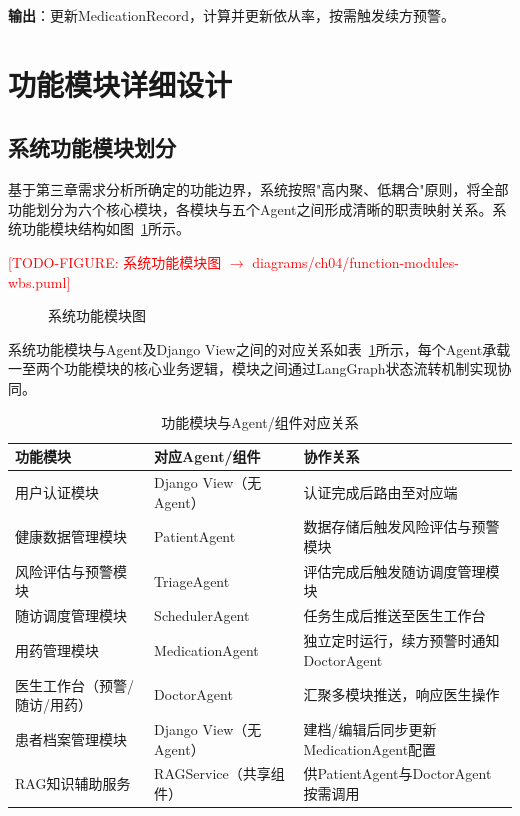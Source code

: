 \textbf{输出}：更新MedicationRecord，计算并更新依从率，按需触发续方预警。


\section{功能模块详细设计}

\subsection{系统功能模块划分}

基于第三章需求分析所确定的功能边界，系统按照"高内聚、低耦合"原则，将全部功能划分为六个核心模块，各模块与五个Agent之间形成清晰的职责映射关系。系统功能模块结构如图~\ref{fig:function-modules}所示。

\todofig{}
\textcolor{red}{[TODO-FIGURE: 系统功能模块图 $\rightarrow$ diagrams/ch04/function-modules-wbs.puml]}
\begin{figure}[H]
\centering
\caption{系统功能模块图}
\label{fig:function-modules}
\end{figure}

系统功能模块与Agent及Django View之间的对应关系如表~\ref{tab:module-agent-mapping}所示，每个Agent承载一至两个功能模块的核心业务逻辑，模块之间通过LangGraph状态流转机制实现协同。

\begin{table}[H]
\centering
\caption{功能模块与Agent/组件对应关系}
\label{tab:module-agent-mapping}
\begin{tabularx}{\textwidth}{|l|l|X|}
\hline
\textbf{功能模块} & \textbf{对应Agent/组件} & \textbf{协作关系} \\
\hline
用户认证模块 & Django View（无Agent） & 认证完成后路由至对应端 \\
\hline
健康数据管理模块 & PatientAgent & 数据存储后触发风险评估与预警模块 \\
\hline
风险评估与预警模块 & TriageAgent & 评估完成后触发随访调度管理模块 \\
\hline
随访调度管理模块 & SchedulerAgent & 任务生成后推送至医生工作台 \\
\hline
用药管理模块 & MedicationAgent & 独立定时运行，续方预警时通知DoctorAgent \\
\hline
医生工作台（预警/随访/用药） & DoctorAgent & 汇聚多模块推送，响应医生操作 \\
\hline
患者档案管理模块 & Django View（无Agent） & 建档/编辑后同步更新MedicationAgent配置 \\
\hline
RAG知识辅助服务 & RAGService（共享组件） & 供PatientAgent与DoctorAgent按需调用 \\
\hline
\end{tabularx}
\end{table}


